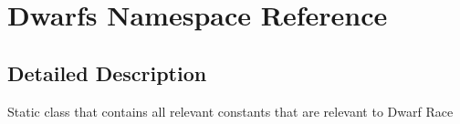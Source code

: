 \hypertarget{namespace_dwarfs}{}\section{Dwarfs Namespace Reference}
\label{namespace_dwarfs}


\subsection{Detailed Description}
Static class that contains all relevant constants that are relevant to Dwarf Race 